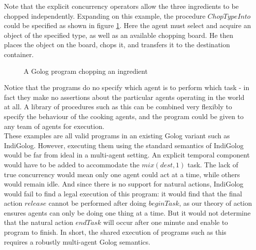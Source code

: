 Note that the explicit concurrency operators allow the three ingredients
to be chopped independently. Expanding on this example, the procedure
$ChopTypeInto$ could be specified as shown in figure \ref{fig:MIndiGolog:ChopTypeInto}.
Here the agent must select and acquire an object of the specified
type, as well as an available chopping board. He then places the object
on the board, chops it, and transfers it to the destination container.

%
\begin{figure}
\begin{centering}
\par\end{centering}

\caption{A Golog program chopping an ingredient\label{fig:MIndiGolog:ChopTypeInto}}

\end{figure}


Notice that the programs do no specify which agent is to perform which
task - in fact they make no assertions about the particular agents
operating in the world at all. A library of procedures such as this
can be combined very flexibly to specify the behaviour of the cooking
agents, and the program could be given to any team of agents for execution.\\


These examples are all valid programs in an existing Golog variant
such as IndiGolog. However, executing them using the standard semantics
of IndiGolog would be far from ideal in a multi-agent setting. An
explicit temporal component would have to be added to accommodate
the $mix(dest,1)$ task. The lack of true concurrency would mean only
one agent could act at a time, while others would remain idle. And
since there is no support for natural actions, IndiGolog would fail
to find a legal execution of this program: it would find that the
final action $release$ cannot be performed after doing $beginTask$,
as our theory of action ensures agents can only be doing one thing
at a time. But it would not determine that the natural action $endTask$
will occur after one minute and enable to program to finish. In short,
the shared execution of programs such as this requires a robustly
multi-agent Golog semantics.


